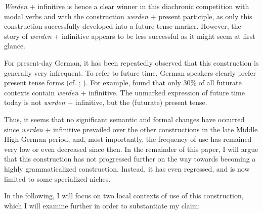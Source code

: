 \documentclass[output=paper,colorlinks,citecolor=brown]{langscibook}
\begin{document}
\par \emph{Werden} + infinitive is hence a clear winner in this diachronic competition with modal verbs and with the construction \emph{werden} + present participle, as only this construction successfully developed into a future tense marker. However, the story of \emph{werden} + infinitive appears to be less successful as it might seem at first glance. 
\par For present-day German, it has been repeatedly observed that this construction is generally very infrequent. To refer to future time, German speakers clearly prefer present tense forms (cf. \citealt{Brons-Albert1982}; \citealt{Hilpert2008}). For example, \citet{Brons-Albert1982} found that only 30\% of all futurate contexts contain \emph{werden} + infinitive. The unmarked expression of future time today is not \emph{werden} + infinitive, but the (futurate) present tense.

\par Thus, it seems that no significant semantic and formal changes have occurred since \emph{werden} + infinitive prevailed over the other constructions in the late Middle High German period, and, most importantly, the frequency of use has remained very low or even decreased since then. In the remainder of this paper, I will argue that this construction has not progressed further on the way towards becoming a highly grammaticalized construction. Instead, it has even regressed, and is now limited to some specialized niches.

\par In the following, I will focus on two local contexts of use of this construction, which I will examine further in order to substantiate my claim: 
\end{document}
